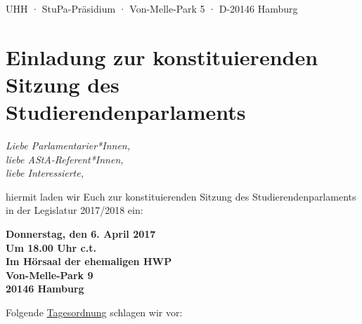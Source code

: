 \documentclass[ngerman,headheight=70pt]{scrartcl}
\begin{document}
    UHH · StuPa-Präsidium · Von-Melle-Park 5 · D-20146 Hamburg

    \section*{Einladung zur konstituierenden Sitzung des Studierendenparlaments}

    \textit{Liebe Parlamentarier*Innen,\\
    liebe AStA-Referent*Innen,\\
    liebe Interessierte,}

    hiermit laden wir Euch zur konstituierenden Sitzung des Studierendenparlaments
    in der Legislatur 2017/2018 ein:

    \textbf{Donnerstag, den 6. April 2017\\
    Um 18.00 Uhr c.t.\\
    Im Hörsaal der ehemaligen HWP\\
    Von-Melle-Park 9\\
    20146 Hamburg}

    Folgende \underline{Tagesordnung} schlagen wir vor:
\end{document}
